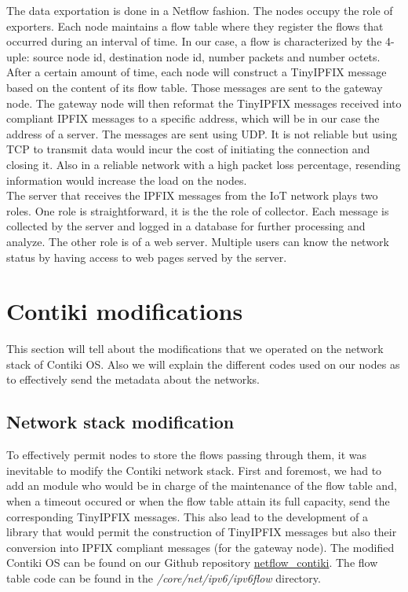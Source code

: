 The data exportation is done in a Netflow fashion. The nodes occupy the role of exporters. Each node maintains a flow table where they register the flows that occurred during an interval of time. In our case, a flow is characterized by the 4-uple: source node id, destination node id, number packets and number octets. After a certain amount of time, each node will construct a TinyIPFIX message based on the content of its flow table. Those messages are sent to the gateway node. The gateway node will then reformat the TinyIPFIX messages received into compliant IPFIX messages to a specific address, which will be in our case the address of a server. The messages are sent using UDP. It is not reliable but using TCP to transmit data would incur the cost of initiating the connection and closing it. Also in a reliable network with a high packet loss percentage, resending information would increase the load on the nodes.\\

The server that receives the IPFIX messages from the IoT network plays two roles. One role is straightforward, it is the the role of collector. Each message is collected by the server and logged in a database for further processing and analyze. The other role is of a web server. Multiple users can know the network status by having access to web pages served by the server.

\section{Contiki modifications}

This section will tell about the modifications that we operated on the network stack of Contiki OS. Also we will explain the different codes used on our nodes as to effectively send the metadata about the networks.

\subsection{Network stack modification}

To effectively permit nodes to store the flows passing through them, it was inevitable to modify the Contiki network stack. First and foremost, we had to add an module who would be in charge of the maintenance of the flow table and, when a timeout occured or when the flow table attain its full capacity, send the corresponding TinyIPFIX messages. This also lead to the development of a library that would permit the construction of TinyIPFIX messages but also their conversion into IPFIX compliant messages (for the gateway node). The modified Contiki OS can be found on our Github repository \href{https://github.com/edd19/netflow_contiki}{netflow\_contiki}. The flow table code can be found in the \textit{/core/net/ipv6/ipv6flow} directory.\\

